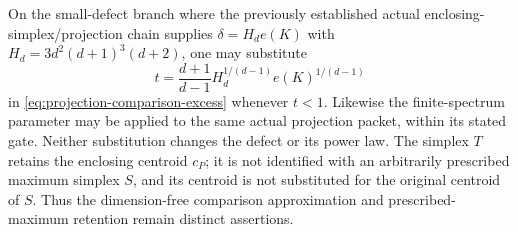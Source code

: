 \begin{remark}
\label{rem:projection-actual-defect-scope}
On the small-defect branch where the previously established actual
enclosing-simplex/projection chain supplies
$\delta=H_de(K)$ with $H_d=3d^2(d+1)^3(d+2)$, one may substitute
\[
 t=\frac{d+1}{d-1}H_d^{1/(d-1)}e(K)^{1/(d-1)}
\]
in \eqref{eq:projection-comparison-excess} whenever $t<1$.
Likewise the finite-spectrum parameter may be applied to the same
actual projection packet, within its stated gate.  Neither
substitution changes the defect or its power law.  The simplex $T$
retains the enclosing centroid $c_P$; it is not identified with an
arbitrarily prescribed maximum simplex $S$, and its centroid is not
substituted for the original centroid of $S$.  Thus the
dimension-free comparison approximation and prescribed-maximum
retention remain distinct assertions.
\end{remark}
